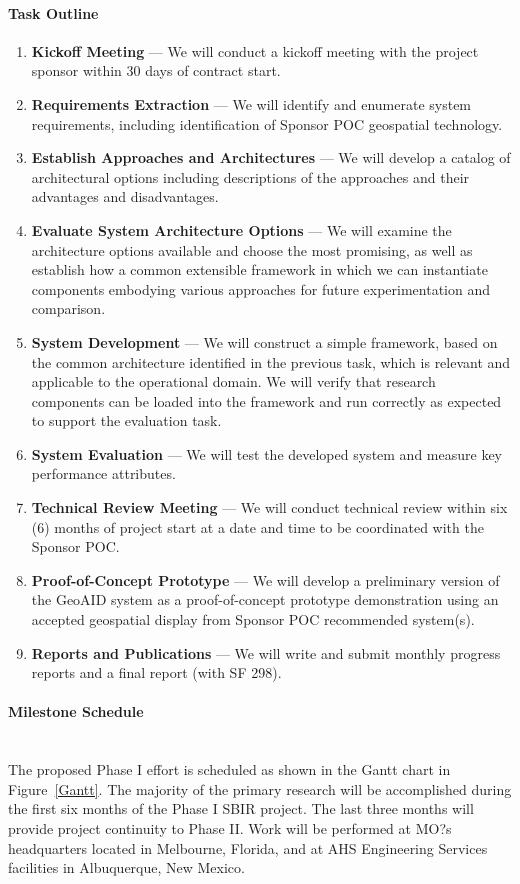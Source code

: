 \documentclass{sbir}
\begin{document}
\paragraph{Task Outline} 
\begin{enumerate}
\item {\bf Kickoff Meeting} --- We will conduct a kickoff meeting with the project sponsor within 30 days of contract start.
\item {\bf Requirements Extraction} --- We will identify and enumerate system requirements, including identification of Sponsor POC geospatial technology.
\item {\bf Establish Approaches and Architectures} --- We will develop a catalog of architectural options including descriptions of the approaches and their advantages and disadvantages.
\item {\bf Evaluate System Architecture Options} --- We will examine the architecture options available and choose the most promising, as well as establish how a common extensible framework in which we can instantiate components embodying various approaches for future experimentation and comparison.
\item {\bf System Development} --- We will construct a simple framework, based on the common architecture identified in the previous task, which is relevant and applicable to the operational domain. We will verify that research components can be loaded into the framework and run correctly as expected to support the evaluation task.
\item {\bf System Evaluation} --- We will test the developed system and measure key performance attributes.
\item {\bf Technical Review Meeting} --- We will conduct technical review within six (6) months of project start at a date and time to be coordinated with the Sponsor POC.
\item {\bf Proof-of-Concept Prototype} --- We will develop a preliminary version of the GeoAID system as a proof-of-concept prototype demonstration using an accepted geospatial display from Sponsor POC recommended system(s).
\item {\bf Reports and Publications} --- We will write and submit monthly progress reports and a final report (with SF 298).
\end{enumerate}

\paragraph{Milestone Schedule}~\\
The proposed Phase I effort is scheduled as shown in the Gantt chart in Figure~\ref{Gantt}. The majority of the primary research will be accomplished during the first six months of the Phase I SBIR project. The last three months will provide project continuity to Phase II. Work will be performed at MO?s headquarters located in Melbourne, Florida, and at AHS Engineering Services facilities in Albuquerque, New Mexico.
\end{document}
